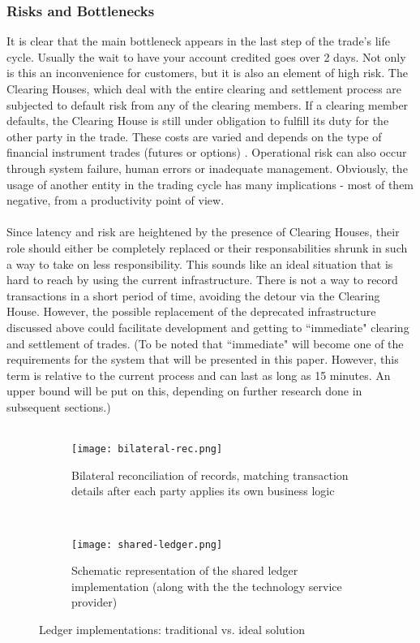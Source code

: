 \documentclass[12pt,twoside]{article}
\begin{document}
\subsubsection{Risks and Bottlenecks}
\label{sub:Risks}
It is clear that the main bottleneck appears in the last step of the trade's life cycle. Usually the wait to have your account credited goes over 2 days. Not only is this an inconvenience for customers, but it is also an element of high risk. The Clearing Houses, which deal with the entire clearing and settlement process are subjected to default risk from any of the clearing members. If a clearing member defaults, the Clearing House is still under obligation to fulfill its duty for the other party in the trade. These costs are varied and depends on the type of financial instrument trades (futures or options) \cite{CHRisk}. Operational risk can also occur through system failure, human errors or inadequate management. Obviously, the usage of another entity in the trading cycle has many implications - most of them negative, from a productivity point of view.
\\ \\
Since latency and risk are heightened by the presence of Clearing Houses, their role should either be completely replaced or their responsabilities shrunk in such a way to take on less responsibility. This sounds like an ideal situation that is hard to reach by using the current infrastructure. There is not a way to record transactions in a short period of time, avoiding the detour via the Clearing House. However, the possible replacement of the deprecated infrastructure discussed above could facilitate development and getting to ``immediate" clearing and settlement of trades. (To be noted that ``immediate" will become one of the requirements for the system that will be presented in this paper. However, this term is relative to the current process and can last as long as 15 minutes. An upper bound will be put on this, depending on further research done in subsequent sections.) \\ \\
\begin{figure}[!htb]
    \centering
    \begin{subfigure}[b]{0.48\textwidth}
    	\centering
        \texttt{[image: bilateral-rec.png]}
        \caption{Bilateral reconciliation of records, matching transaction details after each party applies its own business logic}
        \label{fig:bilateral}
    \end{subfigure}
    ~
    \begin{subfigure}[b]{0.48\textwidth}
    	\centering
        \texttt{[image: shared-ledger.png]}
        \caption{Schematic representation of the shared ledger implementation (along with the the technology service provider)}
        \label{fig:shared}
    \end{subfigure}
    \caption{Ledger implementations: traditional vs. ideal solution \cite{Corda:IP}}
    \label{fig:reconciliation}
\end{figure}
\end{document}
